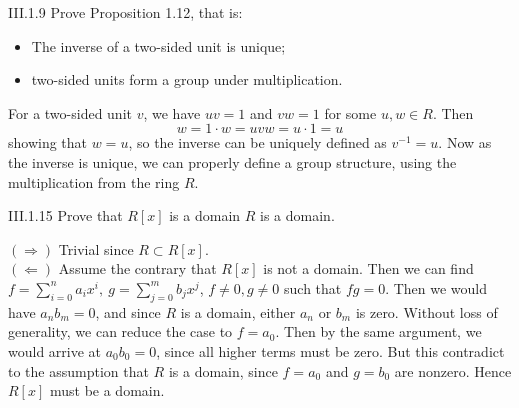 \begin{problem}{III.1.9}
Prove Proposition 1.12, that is:
\begin{itemize}
    \setlength\itemsep{0pc}
    \item The inverse of a two-sided unit is unique;
    \item two-sided units form a group under multiplication.
\end{itemize}
\end{problem}
\begin{pf}
For a two-sided unit $v$, we have $uv = 1$ and $vw = 1$ for some $u,w \in R$. Then 
\[
w = 1 \cdot w = uvw = u \cdot 1 = u    
\]
showing that $w = u$, so the inverse can be uniquely defined as $v^{-1} = u$. Now as the inverse is unique, we can properly define a group structure, using the multiplication from the ring $R$.
\end{pf}

\begin{problem}{III.1.15}
Prove that $R[x]$ is a domain \iffw $R$ is a domain.
\end{problem}
\begin{pf}

\noindent $(\Rightarrow)$ Trivial since $R \subset R[x]$. \\
$(\Leftarrow)$ Assume the contrary that $R[x]$ is not a domain. Then we can find $f = \sum_{i=0}^n a_ix^i, \: g = \sum_{j=0}^m b_jx^j$, $f \neq 0, g \neq 0$ such that $fg = 0$. Then we would have $a_nb_m = 0$, and since $R$ is a domain, either $a_n$ or $b_m$ is zero. Without loss of generality, we can reduce the case to $f = a_0$. Then by the same argument, we would arrive at $a_0b_0 = 0$, since all higher terms must be zero. But this contradict to the assumption that $R$ is a domain, since $f = a_0$ and $g = b_0$ are nonzero. Hence $R[x]$ must be a domain.
\end{pf}

\section{}

